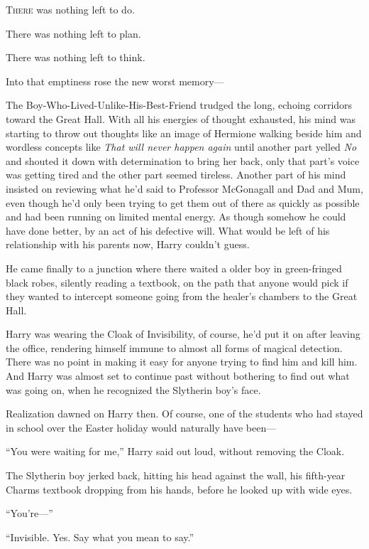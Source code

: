 
\lettrine{T}{here} was nothing
left to do.

\quad\quad
There was nothing left to plan.

There was nothing left to think.

Into that emptiness rose the new worst memory—

The Boy-Who-Lived-Unlike-His-Best-Friend trudged the long, echoing corridors
toward the Great Hall. With all his energies of thought exhausted, his mind was
starting to throw out thoughts like an image of Hermione walking beside him and
wordless concepts like \emph{That will never happen again} until another part
yelled \emph{No} and shouted it down with determination to bring her back, only
that part’s voice was getting tired and the other part seemed tireless. Another
part of his mind insisted on reviewing what he’d said to Professor McGonagall
and Dad and Mum, even though he’d only been trying to get them out of there as
quickly as possible and had been running on limited mental energy. As though
somehow he could have done better, by an act of his defective will. What would
be left of his relationship with his parents now, Harry couldn’t guess.

He came finally to a junction where there waited a older boy in green-fringed
black robes, silently reading a textbook, on the path that anyone would pick if
they wanted to intercept someone going from the healer’s chambers to the Great
Hall.

Harry was wearing the Cloak of Invisibility, of course, he’d put it on after
leaving the office, rendering himself immune to almost all forms of magical
detection. There was no point in making it easy for anyone trying to find him
and kill him. And Harry was almost set to continue past without bothering to
find out what was going on, when he recognized the Slytherin boy’s face.

Realization dawned on Harry then. Of course, one of the students who had stayed
in school over the Easter holiday would naturally have been—

“You were waiting for me,” Harry said out loud, without removing the Cloak.

The Slytherin boy jerked back, hitting his head against the wall, his
fifth-year Charms textbook dropping from his hands, before he looked up with
wide eyes.

“You’re—”

“Invisible. Yes. Say what you mean to say.”

